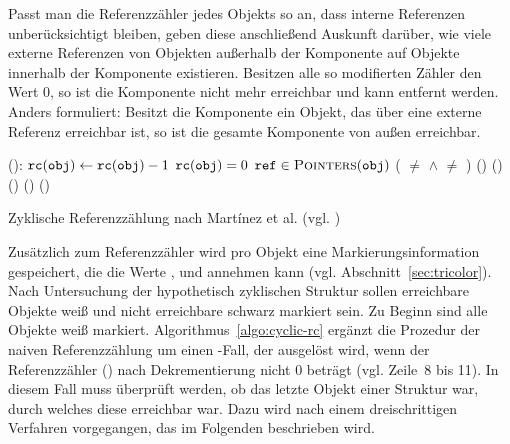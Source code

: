 

Passt man die Referenzzähler jedes Objekts so an, dass interne Referenzen unberücksichtigt bleiben, geben diese anschließend Auskunft darüber, wie viele externe Referenzen von Objekten außerhalb der Komponente auf Objekte innerhalb der Komponente existieren.
Besitzen alle so modifierten Zähler den Wert $0$, so ist die Komponente nicht mehr erreichbar und kann entfernt werden.
Anders formuliert: Besitzt die Komponente ein Objekt, das über eine externe Referenz erreichbar ist, so ist die gesamte Komponente von außen erreichbar.

\begin{algorithm}[h]
\begin{algorithmic}[1]
	\State {}():
	\State \quad $\texttt{rc}(\texttt{obj}) \gets \texttt{rc}(\texttt{obj}) - 1$
	\State \quad \IF $\texttt{rc}(\texttt{obj}) = 0$
	\State \quad \quad \FOREACH $\texttt{ref} \in \textsc{Pointers}(\texttt{obj})$
	\State \quad \quad \quad \IF ( $\neq$ \Null $\wedge$  $\neq$ )
	\State \quad \quad \quad \quad {}()
	\State \quad \quad {}()
	\State \quad \ELSE
	\State \quad \quad {}()		
	\State \quad \quad {}()		
	\State \quad \quad {}()	
\end{algorithmic}
\caption[Zyklische Referenzzählung]{Zyklische Referenzzählung nach Martínez et al. (vgl. \cite[S. 32]{martinez1990})}
\label{algo:cyclic-rc}
\end{algorithm}

Zusätzlich zum Referenzzähler wird pro Objekt eine Markierungsinformation gespeichert, die die Werte ,  und  annehmen kann (vgl. Abschnitt~\ref{sec:tricolor}).
Nach Untersuchung der hypothetisch zyklischen Struktur sollen erreichbare Objekte weiß und nicht erreichbare schwarz markiert sein.
Zu Beginn sind alle Objekte weiß markiert.
Algorithmus~\ref{algo:cyclic-rc} ergänzt die Prozedur  der naiven Referenzzählung um einen \ELSE-Fall, der ausgelöst wird, wenn der Referenzzähler () nach Dekrementierung nicht $0$ beträgt (vgl. Zeile~8 bis 11).
In diesem Fall muss überprüft werden, ob  das letzte Objekt einer Struktur war, durch welches diese erreichbar war.
Dazu wird nach einem dreischrittigen Verfahren vorgegangen, das im Folgenden beschrieben wird.

